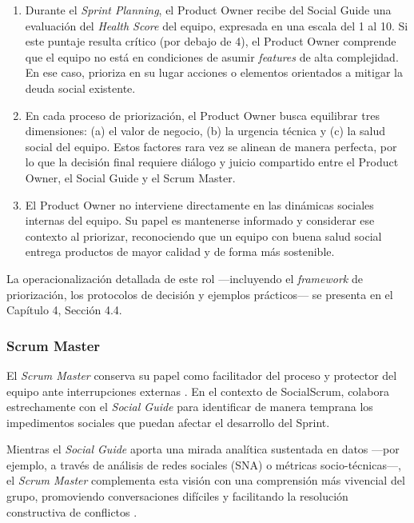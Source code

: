\begin{enumerate}
    \item Durante el \textit{Sprint Planning}, el Product Owner recibe del Social Guide una evaluación del \textit{Health Score} del equipo, expresada en una escala del 1 al 10. Si este puntaje resulta crítico (por debajo de 4), el Product Owner comprende que el equipo no está en condiciones de asumir \textit{features} de alta complejidad. En ese caso, prioriza en su lugar acciones o elementos orientados a mitigar la deuda social existente.
    \item En cada proceso de priorización, el Product Owner busca equilibrar tres dimensiones: (a) el valor de negocio, (b) la urgencia técnica y (c) la salud social del equipo. Estos factores rara vez se alinean de manera perfecta, por lo que la decisión final requiere diálogo y juicio compartido entre el Product Owner, el Social Guide y el Scrum Master.
    \item El Product Owner no interviene directamente en las dinámicas sociales internas del equipo. Su papel es mantenerse informado y considerar ese contexto al priorizar, reconociendo que un equipo con buena salud social entrega productos de mayor calidad y de forma más sostenible.
\end{enumerate}

La operacionalización detallada de este rol —incluyendo el \textit{framework} de priorización, los protocolos de decisión y ejemplos prácticos— se presenta en el Capítulo 4, Sección 4.4.

\subsubsection{Scrum Master}

El \textit{Scrum Master} conserva su papel como facilitador del proceso y protector del equipo ante interrupciones externas \cite{schwaber2020scrum}. En el contexto de SocialScrum, colabora estrechamente con el \textit{Social Guide} para identificar de manera temprana los impedimentos sociales que puedan afectar el desarrollo del Sprint.

Mientras el \textit{Social Guide} aporta una mirada analítica sustentada en datos —por ejemplo, a través de análisis de redes sociales (SNA) o métricas socio-técnicas—, el \textit{Scrum Master} complementa esta visión con una comprensión más vivencial del grupo, promoviendo conversaciones difíciles y facilitando la resolución constructiva de conflictos \cite{saeeda2024nontechnicaldebt}.

